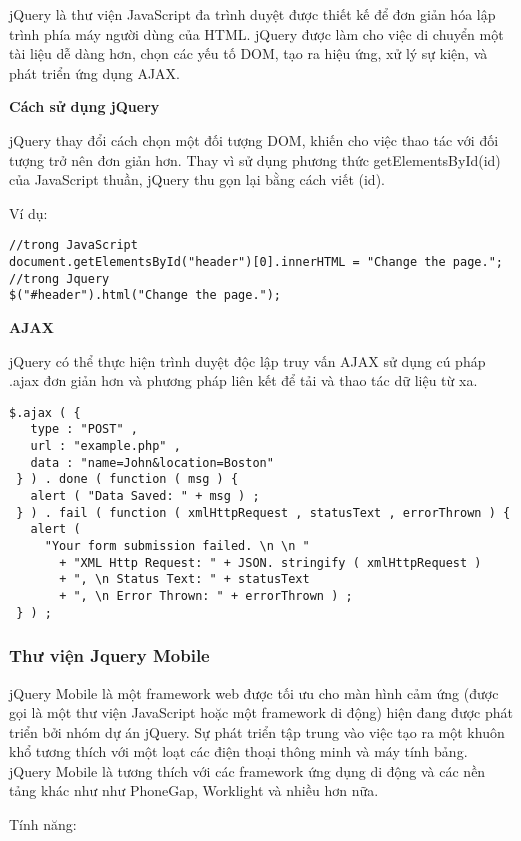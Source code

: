 jQuery là thư viện JavaScript đa trình duyệt được thiết kế để đơn giản hóa lập trình phía máy người dùng của HTML. jQuery được làm cho việc di chuyển một tài liệu dễ dàng hơn, chọn các yếu tố DOM, tạo ra hiệu ứng, xử lý sự kiện, và phát triển ứng dụng AJAX.

\textbf{Cách sử dụng jQuery}

jQuery thay đổi cách chọn một đối tượng DOM, khiến cho việc thao tác với đối tượng trở nên đơn giản hơn. Thay vì sử dụng phương thức getElementsById(id) của JavaScript thuần, jQuery thu gọn lại bằng cách viết \textdollar(id).

Ví dụ:

\begin{lstlisting}
//trong JavaScript
document.getElementsById("header")[0].innerHTML = "Change the page.";
//trong Jquery
$("#header").html("Change the page.");
\end{lstlisting}

\textbf{AJAX}

jQuery có thể thực hiện trình duyệt độc lập truy vấn AJAX sử dụng cú pháp \textdollar.ajax đơn giản hơn và phương pháp liên kết để tải và thao tác dữ liệu từ xa.

\begin{lstlisting}
$.ajax ( {
   type : "POST" ,
   url : "example.php" ,
   data : "name=John&location=Boston"
 } ) . done ( function ( msg ) {
   alert ( "Data Saved: " + msg ) ;
 } ) . fail ( function ( xmlHttpRequest , statusText , errorThrown ) {
   alert (
     "Your form submission failed. \n \n "
       + "XML Http Request: " + JSON. stringify ( xmlHttpRequest )
       + ", \n Status Text: " + statusText
       + ", \n Error Thrown: " + errorThrown ) ;
 } ) ;
\end{lstlisting}

\subsubsection{Thư viện Jquery Mobile}

jQuery Mobile là một framework web được tối ưu cho màn hình cảm ứng (được gọi là một thư viện JavaScript hoặc một framework di động) hiện đang được phát triển bởi nhóm dự án jQuery. Sự phát triển tập trung vào việc tạo ra một khuôn khổ tương thích với một loạt các điện thoại thông minh và máy tính bảng. jQuery Mobile là tương thích với các framework ứng dụng di động và các nền tảng khác như như PhoneGap, Worklight và nhiều hơn nữa.

Tính năng:

